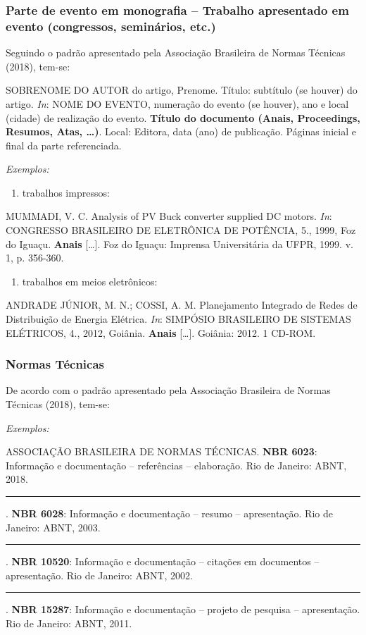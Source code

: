 \documentclass[10pt,a4paper]{article}
\newenvironment{referencias}
  {\begin{list}{}{\setlength{\leftmargin}{2.2em}\setlength{\itemsep}{\baselineskip}
     \setlength{\parsep}{0pt}\setlength{\topsep}{4pt}}
   \singlespacing\raggedright\sloppy}
  {\end{list}}
\newcommand{\referencia}{\item[]}
\newcommand{\exemplos}{\item[]{\itshape Exemplos:}\vspace{-\baselineskip}}
\begin{document}
\subsubsection*{Parte de evento em monografia -- Trabalho apresentado em evento (congressos, seminários, etc.)}
Seguindo o padrão apresentado pela Associação Brasileira de Normas Técnicas (2018), tem-se:
\begin{referencias}
  \referencia SOBRENOME DO AUTOR do artigo, Prenome. Título: subtítulo (se houver) do artigo. \textit{In}: NOME DO EVENTO, numeração do evento (se houver), ano e local (cidade) de realização do evento. \textbf{Título do documento (Anais, Proceedings, Resumos, Atas, \ldots)}. Local: Editora, data (ano) de publicação. Páginas inicial e final da parte referenciada.
  \exemplos
\end{referencias}
\begin{enumerate}
  \item trabalhos impressos:
\end{enumerate}
\begin{referencias}
  \referencia MUMMADI, V. C. Analysis of PV Buck converter supplied DC motors. \textit{In}: CONGRESSO BRASILEIRO DE ELETRÔNICA DE POTÊNCIA, 5., 1999, Foz do Iguaçu. \textbf{Anais} [\ldots]. Foz do Iguaçu: Imprensa Universitária da UFPR, 1999. v. 1, p. 356-360.
\end{referencias}
\begin{enumerate}[resume]
  \item trabalhos em meios eletrônicos:
\end{enumerate}
\begin{referencias}
  \referencia ANDRADE JÚNIOR, M. N.; COSSI, A. M. Planejamento Integrado de Redes de Distribuição de Energia Elétrica. \textit{In}: SIMPÓSIO BRASILEIRO DE SISTEMAS ELÉTRICOS, 4., 2012, Goiânia. \textbf{Anais} [\ldots]. Goiânia: 2012. 1 CD-ROM.
\end{referencias}

\subsubsection*{Normas Técnicas}
De acordo com o padrão apresentado pela Associação Brasileira de Normas Técnicas (2018), tem-se:
\begin{referencias}
  \exemplos
  \referencia ASSOCIAÇÃO BRASILEIRA DE NORMAS TÉCNICAS. \textbf{NBR 6023}: Informação e documentação -- referências -- elaboração. Rio de Janeiro: ABNT, 2018.
  \referencia \rule{1.5cm}{0.4pt}. \textbf{NBR 6028}: Informação e documentação -- resumo -- apresentação. Rio de Janeiro: ABNT, 2003.
  \referencia \rule{1.5cm}{0.4pt}. \textbf{NBR 10520}: Informação e documentação -- citações em documentos -- apresentação. Rio de Janeiro: ABNT, 2002.
  \referencia \rule{1.5cm}{0.4pt}. \textbf{NBR 15287}: Informação e documentação -- projeto de pesquisa -- apresentação. Rio de Janeiro: ABNT, 2011.
\end{referencias}
\end{document}
